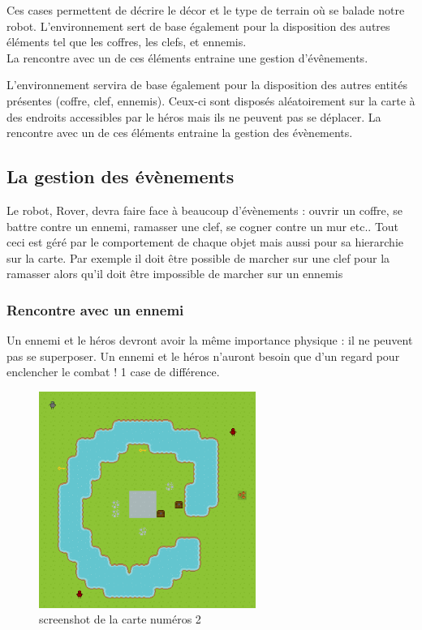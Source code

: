 \documentclass[a4paper 12pts]{article}
\begin{document}
Ces cases permettent de décrire le décor et le type de terrain où se balade notre robot.
L'environnement sert de base également pour la disposition des autres éléments tel que les coffres, les clefs, et ennemis.\\
La rencontre avec un de ces éléments entraine une gestion d'évênements.

L'environnement servira de base également pour la disposition des autres entités présentes (coffre, clef, ennemis).
Ceux-ci sont disposés aléatoirement sur la carte à des endroits accessibles par le héros mais ils ne peuvent pas se déplacer.
La rencontre avec un de ces éléments entraine la gestion des évènements.



\newpage
\subsection{La gestion des évènements}

Le robot, Rover, devra faire face à beaucoup d'évènements : ouvrir un coffre, se battre contre un ennemi, ramasser une clef, se cogner contre un mur etc..
Tout ceci est géré par le comportement de chaque objet mais aussi pour sa hierarchie sur la carte.
Par exemple il doit être possible de marcher sur une clef pour la ramasser alors qu'il doit être impossible de marcher sur un ennemis

\subsubsection {Rencontre avec un ennemi} 
Un ennemi et le héros devront avoir la même importance physique : il ne peuvent pas se superposer.
Un ennemi et le héros n'auront besoin que d'un regard pour enclencher le combat ! 1 case de différence.

\begin{figure}[h!]
	\includegraphics[width=200pt]{Illustration/screens/screen4.png}
\caption{screenshot de la carte numéros 2}
\end{figure}
\vspace{0.75cm}
\end{document}
